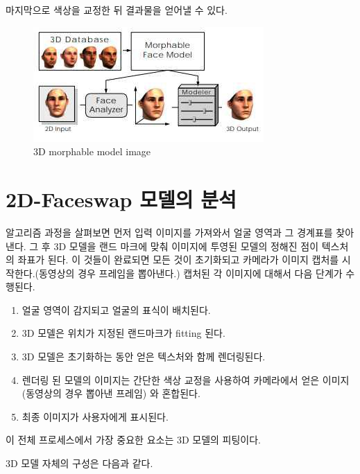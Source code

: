 \documentclass[chapter,oneside]{oblivoir}
\begin{document}
마지막으로 색상을 교정한 뒤 결과물을 얻어낼 수 있다.

\begin{figure}[h!]
  \centering
    \includegraphics{pic/chp2/img712}
  \caption{ 3D morphable model image\cite{reference7}}
\end{figure}


\section{2D-Faceswap 모델의 분석}

알고리즘 과정을 살펴보면 먼저 입력 이미지를 가져와서 얼굴 영역과 그 경계표를 찾아낸다. 그 후 3D 모델을 랜드 마크에 맞춰 이미지에 투영된 모델의 정해진 점이 텍스처의 좌표가 된다. 이 것들이 완료되면 모든 것이 초기화되고 카메라가 이미지 캡처를 시작한다.(동영상의 경우 프레임을 뽑아낸다.) 캡처된 각 이미지에 대해서 다음 단계가 수행된다.

\begin{enumerate}
    \item 얼굴 영역이 감지되고 얼굴의 표식이 배치된다.
    \item 3D 모델은 위치가 지정된 랜드마크가 fitting 된다.
    \item 3D 모델은 초기화하는 동안 얻은 텍스처와 함께 렌더링된다.
    \item 렌더링 된 모델의 이미지는 간단한 색상 교정을 사용하여 카메라에서 얻은 이미지(동영상의 경우 뽑아낸 프레임) 와 혼합된다.
    \item 최종 이미지가 사용자에게 표시된다.
\end{enumerate}

이 전체 프로세스에서 가장 중요한 요소는 3D 모델의 피팅이다. 

3D 모델 자체의 구성은 다음과 같다.
\end{document}
